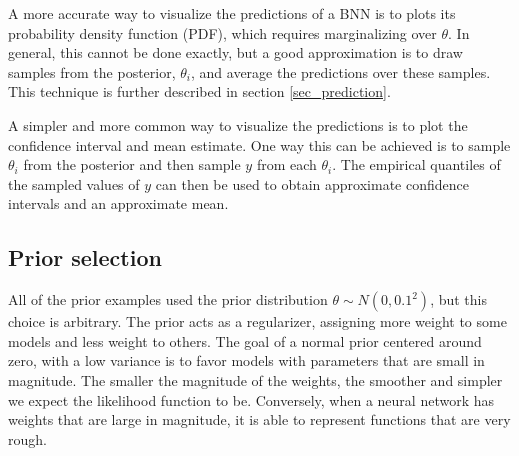 \documentclass[12pt]{article}
\begin{document}
{A more accurate way to visualize the predictions of a BNN is to plots its probability density function (PDF), which requires marginalizing over $\theta$. In general, this cannot be done exactly, but a good approximation is to draw samples from the posterior, $\theta_i$, and average the predictions over these samples. This technique is further described in section \ref{sec_prediction}.

\begin{figure}[H]
\centering
{}
\caption{}
\label{fig_1d_predictions_pdf}
\end{figure}

A simpler and more common way to visualize the predictions is to plot the confidence interval and mean estimate. One way this can be achieved is to sample $\theta_i$ from the posterior and then sample $y$ from each $\theta_i$. The empirical quantiles of the sampled values of $y$ can then be used to obtain approximate confidence intervals and an approximate mean.

\begin{figure}[H]
\centering
{}
\caption{}
\label{fig_1d_predictions_ci}
\end{figure}

\subsection{Prior selection}

All of the prior examples used the prior distribution $\theta \sim N(0, 0.1^2)$, but this choice is arbitrary. The prior acts as a regularizer, assigning more weight to some models and less weight to others. The goal of a normal prior centered around zero, with a low variance is to favor models with parameters that are small in magnitude. The smaller the magnitude of the weights, the smoother and simpler we expect the likelihood function to be. Conversely, when a neural network has weights that are large in magnitude, it is able to represent functions that are very rough.

}
\end{document}
